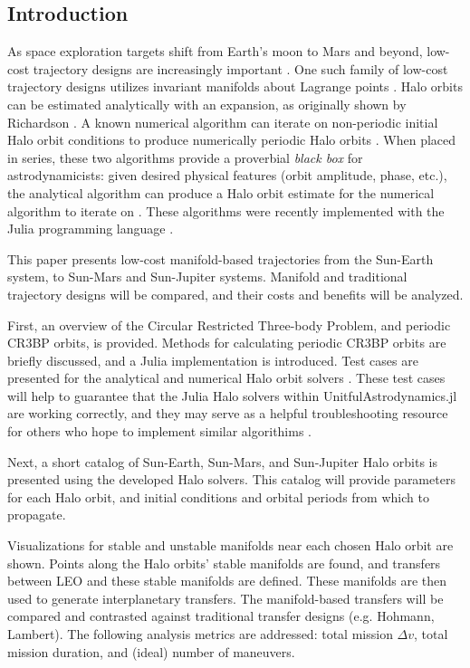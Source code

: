 \documentclass[conf]{new-aiaa}
\begin{document}
\begin{multicols*}{2}
\section{Introduction}
As space exploration targets shift from Earth's moon to Mars and 
beyond, low-cost trajectory designs are increasingly important 
\cite{nasa2020artemis}. One such family of low-cost trajectory 
designs utilizes invariant manifolds about Lagrange points
\cite{rund2018interplanetary}. Halo orbits can be estimated 
analytically with an expansion, as originally shown by Richardson 
\cite{richardson1980analytical} \cite{koon2008dynamical}. A known
numerical algorithm can iterate on non-periodic initial Halo orbit 
conditions to produce numerically periodic Halo orbits
\cite{howell1984three}. When placed in series, these two algorithms 
provide a proverbial \textit{black box} for astrodynamicists: 
given desired physical features (orbit amplitude, phase, etc.), 
the analytical algorithm can produce a Halo orbit estimate for the
numerical algorithm to iterate on \cite{rund2018interplanetary}.
These algorithms were recently implemented with the Julia 
programming language \cite{carpinelli2020halos} 
\cite{carpinelli2020astro} \cite{bezanson2017julia}. 

This paper presents low-cost manifold-based trajectories from 
the Sun-Earth system, to Sun-Mars and Sun-Jupiter systems. 
Manifold and traditional trajectory designs will be compared, 
and their costs and benefits will be analyzed. 

First, an overview of the Circular Restricted Three-body Problem,
and periodic CR3BP orbits, is provided. Methods for calculating
periodic CR3BP orbits are briefly discussed, and a Julia 
implementation is introduced. Test cases are presented for 
the analytical and numerical Halo orbit solvers 
\cite{carpinelli2020halos}. 
These test cases will help to guarantee that the Julia 
Halo solvers within UnitfulAstrodynamics.jl are working correctly,
and they may serve as a helpful troubleshooting resource 
for others who hope to implement similar algorithims 
\cite{carpinelli2020astro}. 

Next, a short catalog of Sun-Earth, Sun-Mars, and Sun-Jupiter 
Halo orbits is presented using the developed Halo solvers.
This catalog will provide parameters for each Halo orbit, 
and initial conditions and orbital periods from which to propagate.

Visualizations for stable and unstable 
manifolds near each chosen Halo orbit are shown. Points along the 
Halo orbits' stable manifolds are found, and 
transfers between LEO and these stable manifolds are defined. 
These manifolds are then used to generate interplanetary 
transfers. The manifold-based transfers will be compared and 
contrasted against traditional transfer designs (e.g. Hohmann, 
Lambert). The following analysis metrics are addressed: total 
mission $\Delta v$, total mission duration, and (ideal) 
number of maneuvers.


\end{multicols*}
\end{document}
